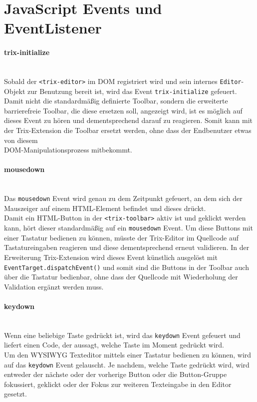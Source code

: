 \section{JavaScript Events und EventListener}
\paragraph{trix-initialize}\mbox{}\\
Sobald der \texttt{<trix-editor>} im DOM registriert wird und sein internes \texttt{Editor}-Objekt zur Benutzung bereit ist, wird das Event \texttt{trix-initialize} gefeuert.\\
Damit nicht die standardmäßig definierte Toolbar, sondern die erweiterte barrierefreie Toolbar, die diese ersetzen soll, angezeigt wird, ist es möglich auf dieses Event zu hören und dementsprechend darauf zu reagieren. Somit kann mit der Trix-Extension die Toolbar ersetzt werden, ohne dass der Endbenutzer etwas von diesem \\
DOM-Manipulationsprozess mitbekommt. %

\paragraph{mousedown}\mbox{}\\
Das \texttt{mousedown} Event wird genau zu dem Zeitpunkt gefeuert, an dem sich der Mauszeiger auf einem HTML-Element befindet und dieses drückt.\\
Damit ein HTML-Button in der \texttt{<trix-toolbar>} aktiv ist und geklickt werden kann, hört dieser standardmäßig auf ein \texttt{mousedown} Event. Um diese Buttons mit einer Tastatur bedienen zu können, müsste der Trix-Editor im Quellcode auf Tastatureingaben reagieren und diese dementsprechend erneut validieren. In der Erweiterung Trix-Extension wird dieses Event künstlich ausgelöst mit \texttt{EventTarget.dispatchEvent()} und somit sind die Buttons in der Toolbar auch über die Tastatur bedienbar, ohne dass der Quellcode mit Wiederholung der Validation ergänzt werden muss.

\paragraph{keydown}\mbox{}\\
Wenn eine beliebige Taste gedrückt ist, wird das \texttt{keydown} Event gefeuert und liefert einen Code, der aussagt, welche Taste im Moment gedrückt wird.\\
Um den WYSIWYG Texteditor mittels einer Tastatur bedienen zu können, wird auf das \texttt{keydown} Event gelauscht. Je nachdem, welche Taste gedrückt wird, wird entweder der nächste oder der vorherige Button oder die Button-Gruppe fokussiert, geklickt oder der Fokus zur weiteren Texteingabe in den Editor gesetzt.\\

